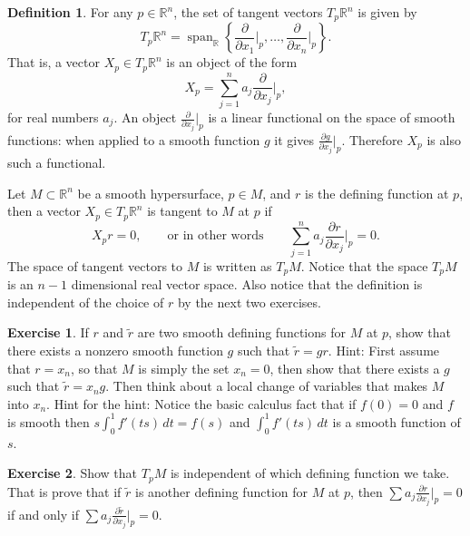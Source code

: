 \documentclass[12pt,openany]{book}
\newcommand{\R}{{\mathbb{R}}}
\theoremstyle{plain}
\theoremstyle{remark}
\theoremstyle{definition}
\newtheorem{defn}[thm]{Definition}
\newenvironment{exbox}{%
    \def\FrameCommand{\vrule width 1pt \relax\hspace {10pt}}%
    \MakeFramed {\advance \hsize -\width \FrameRestore }%
}{%
    \endMakeFramed
}
\theoremstyle{exercise}
\newtheorem{exercise}{Exercise}[section]
\theoremstyle{example}
\begin{document}
\begin{defn}
For any $p \in \R^n$, the set of tangent vectors $T_p \R^n$ is given by
\begin{equation*}
T_p \R^n = \operatorname{span}_{\R} \left\{
\frac{\partial}{\partial x_1}\Big|_p,
\ldots,
\frac{\partial}{\partial x_n}\Big|_p \right\} .
\end{equation*}
That is, a vector $X_p \in T_p \R^n$ is an object of the form
\begin{equation*}
X_p = \sum_{j=1}^n a_j 
\frac{\partial}{\partial x_j}\Big|_p ,
\end{equation*}
for real numbers $a_j$.
An object $\frac{\partial}{\partial x_j}\Big|_p$ is a linear functional
on the space of smooth functions:
when applied to a smooth function $g$ it gives
$\frac{\partial g}{\partial x_j} \Big|_p$.  Therefore $X_p$ is also such a
functional.

Let $M \subset \R^n$ be a smooth hypersurface, %
$p \in M$, and $r$ is the defining function at $p$,
then a vector $X_p \in T_p \R^n$ is tangent 
to $M$ at $p$ if
\begin{equation*}
X_p r = 0, \qquad \text{or in other words} \qquad
\sum_{j=1}^n a_j \frac{\partial r}{\partial x_j} \Big|_p = 0 .
\end{equation*}
The space of tangent vectors to $M$ is written as $T_p M$.  Notice that the
space $T_pM$ is an $n-1$ dimensional real vector space.  Also notice that
the definition is independent of the choice of $r$ by the next two
exercises.

\begin{exbox}
\begin{exercise}
If $r$ and $\tilde{r}$ are two smooth defining functions for $M$ at $p$,
show that there exists a nonzero smooth function $g$ such that
$\tilde{r} = g r$.
Hint: First assume that $r=x_n$, so that $M$ is simply the set $x_n = 0$,
then show that there exists a $g$ such that $\tilde{r} = x_n g$.  Then think
about a local change of variables that makes $M$ into $x_n$.  Hint for the
hint: Notice
the basic calculus fact that if $f(0) = 0$ and $f$ is smooth then
$s \int_0^1 f'(ts) \,dt = f(s)$
and $\int_0^1 f'(ts) \,dt$ is a smooth function of $s$.
\end{exercise}

\begin{exercise}
Show that $T_pM$ is independent of which defining function we take.  That is
prove that if $\tilde{r}$ is another defining function for $M$ at $p$, then
$\sum a_j \frac{\partial r}{\partial x_j} \Big|_p = 0$
if and only if
$\sum a_j \frac{\partial \tilde{r}}{\partial x_j} \Big|_p = 0$.
\end{exercise}
\end{exbox}


\end{defn}
\end{document}
